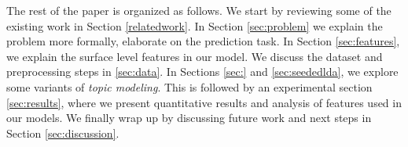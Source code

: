 The rest of the paper is organized as follows. We start by reviewing some of the existing work in Section \ref{relatedwork}. In Section \ref{sec:problem} we explain the problem more formally, elaborate on the prediction task. In Section \ref{sec:features}, we explain the surface level features in our model. We discuss the dataset and preprocessing steps in \ref{sec:data}. In Sections \ref{sec:} and \ref{sec:seededlda}, we explore some variants of \textit{topic modeling}. This is followed by an experimental section \ref{sec:results}, where we present quantitative results and analysis of features used in our models. We finally wrap up by discussing future work and next steps in Section \ref{sec:discussion}.

